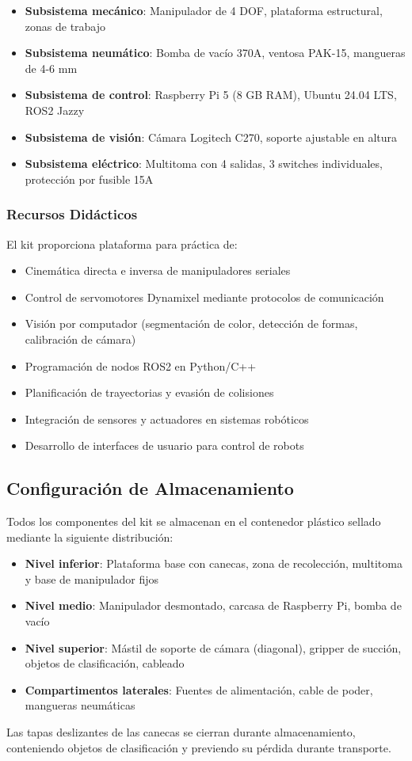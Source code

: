 \begin{itemize}
    \item \textbf{Subsistema mecánico}: Manipulador de 4 DOF, plataforma estructural, zonas de trabajo
    \item \textbf{Subsistema neumático}: Bomba de vacío 370A, ventosa PAK-15, mangueras de 4-6 mm
    \item \textbf{Subsistema de control}: Raspberry Pi 5 (8 GB RAM), Ubuntu 24.04 LTS, ROS2 Jazzy
    \item \textbf{Subsistema de visión}: Cámara Logitech C270, soporte ajustable en altura
    \item \textbf{Subsistema eléctrico}: Multitoma con 4 salidas, 3 switches individuales, protección por fusible 15A
\end{itemize}

\subsubsection{Recursos Didácticos}

El kit proporciona plataforma para práctica de:

\begin{itemize}
    \item Cinemática directa e inversa de manipuladores seriales
    \item Control de servomotores Dynamixel mediante protocolos de comunicación
    \item Visión por computador (segmentación de color, detección de formas, calibración de cámara)
    \item Programación de nodos ROS2 en Python/C++
    \item Planificación de trayectorias y evasión de colisiones
    \item Integración de sensores y actuadores en sistemas robóticos
    \item Desarrollo de interfaces de usuario para control de robots
\end{itemize}

\subsection{Configuración de Almacenamiento}

Todos los componentes del kit se almacenan en el contenedor plástico sellado mediante la siguiente distribución:

\begin{itemize}
    \item \textbf{Nivel inferior}: Plataforma base con canecas, zona de recolección, multitoma y base de manipulador fijos
    \item \textbf{Nivel medio}: Manipulador desmontado, carcasa de Raspberry Pi, bomba de vacío
    \item \textbf{Nivel superior}: Mástil de soporte de cámara (diagonal), gripper de succión, objetos de clasificación, cableado
    \item \textbf{Compartimentos laterales}: Fuentes de alimentación, cable de poder, mangueras neumáticas
\end{itemize}

Las tapas deslizantes de las canecas se cierran durante almacenamiento, conteniendo objetos de clasificación y previendo su pérdida durante transporte.
